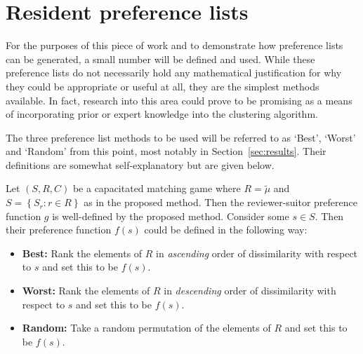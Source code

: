 \section{Resident preference lists}\label{sec:preferences}

For the purposes of this piece of work and to demonstrate how preference lists
can be generated, a small number will be defined and used. While these
preference lists do not necessarily hold any mathematical justification for why
they could be appropriate or useful at all, they are the simplest methods
available. In fact, research into this area could prove to be promising as a
means of incorporating prior or expert knowledge into the clustering algorithm.

\begin{definition}\label{def:preferences}
    The three preference list methods to be used will be referred to as `Best',
    `Worst' and `Random' from this point, most notably in
    Section~\ref{sec:results}. Their definitions are somewhat self-explanatory
    but are given below.

    Let \((S, R, C)\) be a capacitated matching game where \(R = \tilde{\mu}\)
    and \(S = \left\{S_r : r \in R\right\}\) as in the proposed method. Then the
    reviewer-suitor preference function \(g\) is well-defined by the proposed
    method. Consider some \(s \in S\). Then their preference function \(f(s)\)
    could be defined in the following way:
    \begin{itemize}
        \item \textbf{Best:} Rank the elements of \(R\) in \emph{ascending}
            order of dissimilarity with respect to \(s\) and set this to be
            \(f(s)\).
        \item \textbf{Worst:} Rank the elements of \(R\) in \emph{descending}
            order of dissimilarity with respect to \(s\) and set this to be
            \(f(s)\).
        \item \textbf{Random:} Take a random permutation of the elements of
            \(R\) and set this to be \(f(s)\).
    \end{itemize}
\end{definition}

